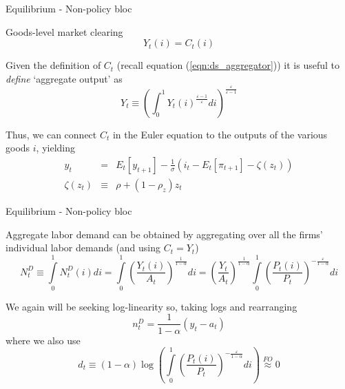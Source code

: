 \documentclass{beamer}
\begin{document}

	
\begin{frame}[label=jump]{Equilibrium - Non-policy bloc}

Goods-level market clearing
\[
Y_{t}(i)=C_{t}(i)
\]

Given the definition of $C_{t}$ (recall equation (\ref{eqn:ds_aggregator})) it is useful to \emph{define} `aggregate output' as
\[
Y_{t} \equiv \left( \int_{0}^{1} Y_{t}\left( i \right)^{\frac{\varepsilon-1}{\varepsilon}} di \right)^{\frac{\varepsilon}{\varepsilon-1}} 
\]

Thus, we can connect $C_{t}$ in the Euler equation to the outputs of the various goods $i$, yielding
\begin{eqnarray*}
y_{t} &=& E_{t}[y_{t+1}] - \frac{1}{\sigma}\left( i_{t} - E_{t}[ \pi_{t+1} ] -  \zeta\left(z_{t}\right) \right)  \\
\zeta\left(z_{t}\right) &\equiv& \rho + \left( 1 - \rho_{z} \right) z_{t} 
\end{eqnarray*}

\end{frame}



	
\begin{frame}{Equilibrium - Non-policy bloc}

Aggregate labor demand can be obtained by aggregating over all the firms' individual labor demands (and using $C_{t}=Y_{t}$)
\[
N^{D}_{t} \equiv \int\limits_{0}^{1} N^{D}_{t}(i) di = \int\limits_{0}^{1} \left( \frac{Y_{t}(i)}{A_{t}} \right)^{\frac{1}{1-\alpha}} di = \left( \frac{Y_{t}}{A_{t}} \right)^{\frac{1}{1-\alpha}} \int\limits_{0}^{1} \left( \frac{P_{t}(i)}{P_{t}} \right)^{-\frac{\varepsilon}{1-\alpha}}di
\]

We again will be seeking log-linearity so, taking logs and rearranging
\[
n_{t}^{D} = \frac{1}{1-\alpha}(y_{t} - a_{t})
\]
where we also use
\[
d_{t}\equiv (1-\alpha)\log{\left(  \int\limits_{0}^{1} \left( \frac{P_{t}(i)}{P_{t}} \right)^{-\frac{\varepsilon}{1-\alpha}}di \right)} \stackrel{FO}{\approx} 0
\]

\end{frame}

\end{document}
